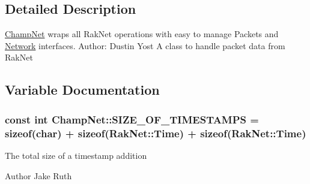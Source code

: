 \subsection{Detailed Description}
\hyperlink{namespace_champ_net}{Champ\-Net} wraps all Rak\-Net operations with easy to manage Packets and \hyperlink{class_champ_net_1_1_network}{Network} interfaces. Author\-: Dustin Yost A class to handle packet data from Rak\-Net 

\subsection{Variable Documentation}
\hypertarget{namespace_champ_net_ae8bece8e869e20f234d9ae67256a735f}{
\subsubsection[{S\-I\-Z\-E\-\_\-\-O\-F\-\_\-\-T\-I\-M\-E\-S\-T\-A\-M\-P\-S}]{\setlength{\rightskip}{0pt plus 5cm}const int Champ\-Net\-::\-S\-I\-Z\-E\-\_\-\-O\-F\-\_\-\-T\-I\-M\-E\-S\-T\-A\-M\-P\-S = sizeof(char) + sizeof(Rak\-Net\-::\-Time) + sizeof(Rak\-Net\-::\-Time)}}\label{namespace_champ_net_ae8bece8e869e20f234d9ae67256a735f}
The total size of a timestamp addition \begin{DoxyAuthor}{Author}
Jake Ruth 
\end{DoxyAuthor}
